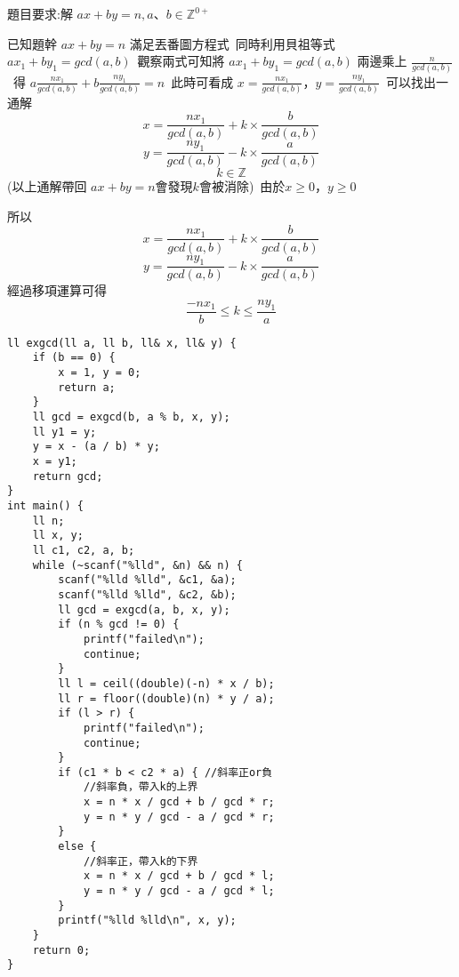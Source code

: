 題目要求:解 $ax+by=n, a、b \in \mathbb{Z}^{0+}$

已知題幹 $ax+by=n$ 滿足丟番圖方程式\
同時利用貝祖等式 $ax_1 + by_1 = gcd(a, b)$\
觀察兩式可知將 $ax_1 + by_1 = gcd(a, b)$ 兩邊乘上 $\frac{n}{gcd(a, b)}$\
得 $a\frac{nx_1}{gcd(a, b)} + b\frac{ny_1}{gcd(a, b)} = n$\
此時可看成 $x = \frac{nx_1}{gcd(a, b)}$，$y = \frac{ny_1}{gcd(a, b)}$\
可以找出一通解
$$x = \frac{nx_1}{gcd(a, b)} + k \times \frac{b}{gcd(a, b)}$$
$$y = \frac{ny_1}{gcd(a, b)} - k \times \frac{a}{gcd(a, b)}$$
$$k \in \mathbb{Z}$$
(以上通解帶回 $ax + by = n$會發現$k$會被消除)\
$由於x \geq 0，y \geq 0$

所以$$x = \frac{nx_1}{gcd(a, b)} + k \times \frac{b}{gcd(a, b)}$$
$$y = \frac{ny_1}{gcd(a, b)} - k \times \frac{a}{gcd(a, b)}$$
經過移項運算可得
$$\frac{-nx_1}{b} \leq k \leq \frac{ny_1}{a}$$

\begin{lstlisting}
ll exgcd(ll a, ll b, ll& x, ll& y) {
    if (b == 0) {
        x = 1, y = 0;
        return a;
    }
    ll gcd = exgcd(b, a % b, x, y);
    ll y1 = y;
    y = x - (a / b) * y;
    x = y1;
    return gcd;
}
int main() {
    ll n;
    ll x, y;
    ll c1, c2, a, b;
    while (~scanf("%lld", &n) && n) {
        scanf("%lld %lld", &c1, &a);
        scanf("%lld %lld", &c2, &b);
        ll gcd = exgcd(a, b, x, y);
        if (n % gcd != 0) {
            printf("failed\n");
            continue;
        }
        ll l = ceil((double)(-n) * x / b);
        ll r = floor((double)(n) * y / a);
        if (l > r) {
            printf("failed\n");
            continue;
        }
        if (c1 * b < c2 * a) { //斜率正or負
            //斜率負，帶入k的上界
            x = n * x / gcd + b / gcd * r;
            y = n * y / gcd - a / gcd * r;
        }
        else {
            //斜率正，帶入k的下界
            x = n * x / gcd + b / gcd * l;
            y = n * y / gcd - a / gcd * l;
        }
        printf("%lld %lld\n", x, y);
    }
    return 0;
}
\end{lstlisting}